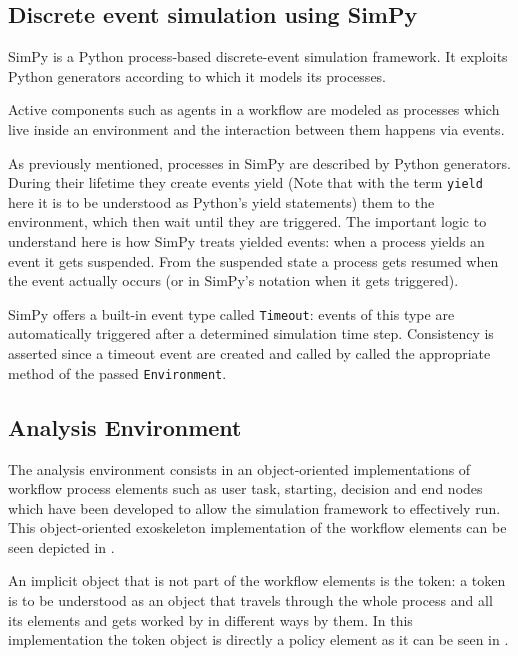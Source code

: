 \documentclass{seal_thesis}
\begin{document}
\subsection{Discrete event simulation using SimPy}

SimPy is a Python process-based discrete-event simulation framework. It exploits Python generators according to which it models its processes. 

Active components such as agents in a workflow are modeled as processes which live inside an environment and the interaction between them happens via events. 

As previously mentioned, processes in SimPy are described by Python generators. During their lifetime they create events yield (Note that with the term \texttt{yield} here it is to be understood as Python's yield statements) them to the environment, which then wait until they are triggered. The important logic to understand here is how SimPy treats yielded events: when a process yields an event it gets suspended. From the suspended state a process gets resumed when the event actually occurs (or in SimPy's notation when it gets triggered).

SimPy offers a built-in event type called \texttt{Timeout}: events of this type are automatically triggered after a determined simulation time step. Consistency is asserted since a timeout event are created and called by called the appropriate method of the passed \texttt{Environment}.

\subsection{Analysis Environment}

The analysis environment consists in an object-oriented implementations of workflow process elements such as user task, starting, decision and end nodes which have been developed to allow the simulation framework to effectively run. This object-oriented exoskeleton implementation of the workflow elements can be seen depicted in .


An implicit object that is not part of the workflow elements is the token: a token is to be understood as an object that travels through the whole process and all its elements and gets worked by in different ways by them. In this implementation the token object is directly a policy element as it can be seen in .
\end{document}
